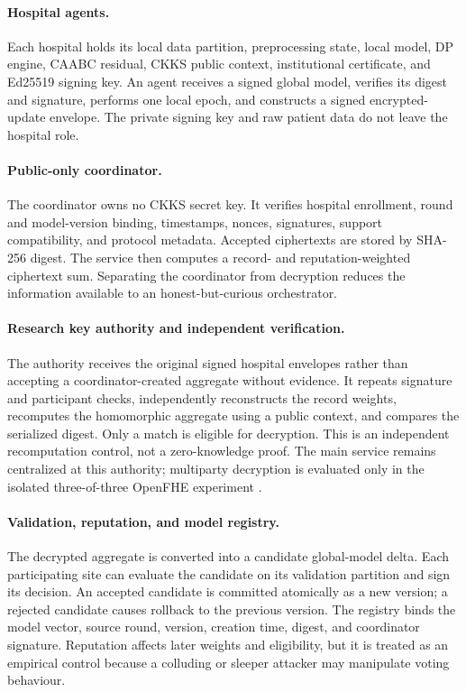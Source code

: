 \paragraph{Hospital agents.}
Each hospital holds its local data partition, preprocessing state, local model, DP engine, CAABC residual, CKKS public context, institutional certificate, and Ed25519 signing key. An agent receives a signed global model, verifies its digest and signature, performs one local epoch, and constructs a signed encrypted-update envelope. The private signing key and raw patient data do not leave the hospital role.

\paragraph{Public-only coordinator.}
The coordinator owns no CKKS secret key. It verifies hospital enrollment, round and model-version binding, timestamps, nonces, signatures, support compatibility, and protocol metadata. Accepted ciphertexts are stored by SHA-256 digest. The service then computes a record- and reputation-weighted ciphertext sum. Separating the coordinator from decryption reduces the information available to an honest-but-curious orchestrator.

\paragraph{Research key authority and independent verification.}
The authority receives the original signed hospital envelopes rather than accepting a coordinator-created aggregate without evidence. It repeats signature and participant checks, independently reconstructs the record weights, recomputes the homomorphic aggregate using a public context, and compares the serialized digest. Only a match is eligible for decryption. This is an independent recomputation control, not a zero-knowledge proof. The main service remains centralized at this authority; multiparty decryption is evaluated only in the isolated three-of-three OpenFHE experiment \cite{mouchet2021multiparty}.

\paragraph{Validation, reputation, and model registry.}
The decrypted aggregate is converted into a candidate global-model delta. Each participating site can evaluate the candidate on its validation partition and sign its decision. An accepted candidate is committed atomically as a new version; a rejected candidate causes rollback to the previous version. The registry binds the model vector, source round, version, creation time, digest, and coordinator signature. Reputation affects later weights and eligibility, but it is treated as an empirical control because a colluding or sleeper attacker may manipulate voting behaviour.

